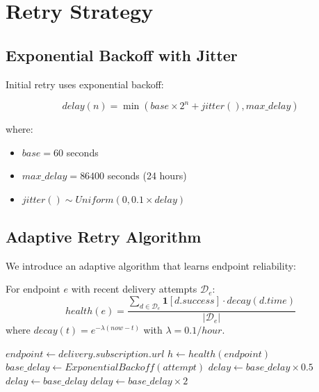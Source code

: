 \section{Retry Strategy}


\subsection{Exponential Backoff with Jitter}

Initial retry uses exponential backoff:

\begin{equation}
delay(n) = \min(base \times 2^n + jitter(), max\_delay)
\end{equation}

where:
\begin{itemize}
    \item $base = 60$ seconds
    \item $max\_delay = 86400$ seconds (24 hours)
    \item $jitter() \sim Uniform(0, 0.1 \times delay)$
\end{itemize}

\subsection{Adaptive Retry Algorithm}

We introduce an adaptive algorithm that learns endpoint reliability:

\begin{definition}
For endpoint $e$ with recent delivery attempts $\mathcal{D}_e$:
\begin{equation}
health(e) = \frac{\sum_{d \in \mathcal{D}_e} \mathbf{1}[d.success] \cdot decay(d.time)}{|\mathcal{D}_e|}
\end{equation}
where $decay(t) = e^{-\lambda(now - t)}$ with $\lambda = 0.1/hour$.
\end{definition}

\begin{algorithm}
\caption{Adaptive Retry Scheduling}
\begin{algorithmic}[1]
    \State $endpoint \gets delivery.subscription.url$
    \State $h \gets health(endpoint)$
    \State $base\_delay \gets ExponentialBackoff(attempt)$
        \State {}
        \State $delay \gets base\_delay \times 0.5$
        \State {}
        \State $delay \gets base\_delay$
    \Else
        \State {}
        \State $delay \gets base\_delay \times 2$
    \EndIf
    \State {}
\EndFunction
\end{algorithmic}
\end{algorithm}

